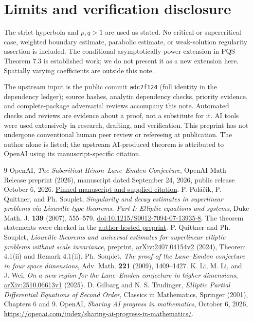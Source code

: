 \documentclass[11pt]{article}
\begin{document}
\section{Limits and verification disclosure}
The strict hyperbola and $p,q>1$ are used as stated. No critical or
supercritical case, weighted boundary estimate, parabolic estimate,
or weak-solution regularity assertion is included. The conditional
asymptotically-power extension in PQS Theorem 7.3 is established work;
we do not present it as a new extension here. Spatially varying
coefficients are outside this note.

The upstream input is the public commit
\texttt{adc7f124} (full identity in the dependency ledger); source hashes,
analytic dependency checks, priority evidence, and complete-package
adversarial reviews accompany this note. Automated checks and reviews
are evidence about a proof, not a substitute for it. AI tools were used
extensively in research, drafting, and verification. This preprint has
not undergone conventional human peer review or refereeing at publication.
The author alone is listed; the upstream AI-produced theorem is
attributed to OpenAI using its manuscript-specific citation.

\begin{thebibliography}{9}
 OpenAI, \emph{The Subcritical H\'enon--Lane--Emden
Conjecture}, OpenAI Math Release preprint (2026), manuscript dated
September 24, 2026, public release October 6, 2026.
\href{https://github.com/openai/math/tree/adc7f1241b42e322a6451854ab7e4b4c146bf78a/preprints/The-Subcritical-Henon-Lane-Emden-Conjecture-September-24-2026}{Pinned manuscript and supplied citation}.
 P. Pol\'a\v{c}ik, P. Quittner, and Ph. Souplet,
\emph{Singularity and decay estimates in superlinear problems via
Liouville-type theorems. Part I: Elliptic equations and systems},
Duke Math. J. \textbf{139} (2007), 555--579.
\href{https://doi.org/10.1215/S0012-7094-07-13935-8}{doi:10.1215/S0012-7094-07-13935-8}.
The theorem statements were checked in the
\href{https://www-users.cse.umn.edu/~polacik/Publications/pqs1.pdf}{author-hosted preprint}.
 P. Quittner and Ph. Souplet,
\emph{Liouville theorems and universal estimates for superlinear
elliptic problems without scale invariance}, preprint,
\href{https://arxiv.org/abs/2407.04154v2}{arXiv:2407.04154v2} (2024),
Theorem 4.1(ii) and Remark 4.1(ii).
 Ph. Souplet, \emph{The proof of the Lane--Emden
conjecture in four space dimensions}, Adv. Math. \textbf{221} (2009),
1409--1427.
 K. Li, M. Li, and J. Wei,
\emph{On a new region for the Lane--Emden conjecture in higher dimensions},
\href{https://arxiv.org/abs/2510.06613v1}{arXiv:2510.06613v1} (2025).
 D. Gilbarg and N. S. Trudinger,
\emph{Elliptic Partial Differential Equations of Second Order},
Classics in Mathematics, Springer (2001), Chapters 6 and 9.
 OpenAI, \emph{Sharing AI progress in mathematics},
October 6, 2026,
\url{https://openai.com/index/sharing-ai-progress-in-mathematics/}.
\end{thebibliography}
\end{document}
